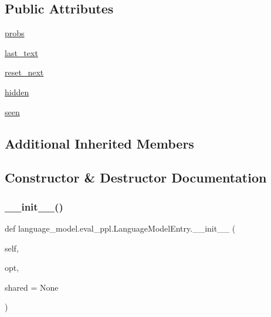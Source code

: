 \subsection*{Public Attributes}
\begin{DoxyCompactItemize}
\item 
\hyperlink{classlanguage__model_1_1eval__ppl_1_1LanguageModelEntry_a56bd1620561edf44373182bf5324d1bd}{probs}
\item 
\hyperlink{classlanguage__model_1_1eval__ppl_1_1LanguageModelEntry_af1143417ff0e3910c4fabc386e17ff94}{last\+\_\+text}
\item 
\hyperlink{classlanguage__model_1_1eval__ppl_1_1LanguageModelEntry_a57e88deff0cee954bca24b4ff34c7729}{reset\+\_\+next}
\item 
\hyperlink{classlanguage__model_1_1eval__ppl_1_1LanguageModelEntry_a7c97d0414fa78165b9d85cc4399ac87d}{hidden}
\item 
\hyperlink{classlanguage__model_1_1eval__ppl_1_1LanguageModelEntry_a3beb0703ab3b39e2c38956978435fd17}{seen}
\end{DoxyCompactItemize}
\subsection*{Additional Inherited Members}


\subsection{Constructor \& Destructor Documentation}
\mbox{\label{classlanguage__model_1_1eval__ppl_1_1LanguageModelEntry_a295c7e2f6cb59aca07f985d82e4f34c5}} 
\subsubsection{\texorpdfstring{\+\_\+\+\_\+init\+\_\+\+\_\+()}{\_\_init\_\_()}}
{\footnotesize\ttfamily def language\+\_\+model.\+eval\+\_\+ppl.\+Language\+Model\+Entry.\+\_\+\+\_\+init\+\_\+\+\_\+ (\begin{DoxyParamCaption}\item[{}]{self,  }\item[{}]{opt,  }\item[{}]{shared = {\ttfamily None} }\end{DoxyParamCaption})}



